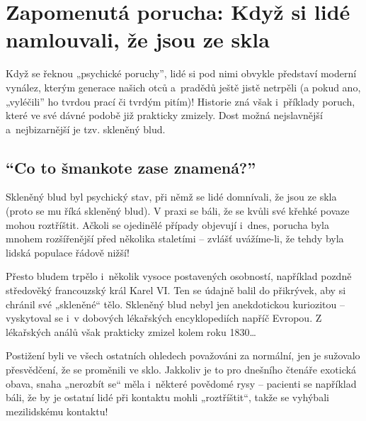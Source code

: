 \documentclass[main.tex]{subfiles}
\begin{document}
\section{Zapomenutá porucha: Když si lidé namlouvali, že jsou ze skla}
Když se řeknou „psychické poruchy”, lidé si pod nimi obvykle představí moderní vynález, kterým generace našich otců a~pradědů ještě jistě netrpěli (a pokud ano, „vyléčili” ho tvrdou prací či tvrdým pitím)! Historie zná však i~příklady poruch, které ve své dávné podobě již prakticky zmizely. Dost možná nejslavnější a~nejbizarnější je tzv. skleněný blud.
\subsection*{\enquote{Co to šmankote zase znamená?}}
Skleněný blud byl psychický stav, při němž se lidé domnívali, že jsou ze skla (proto se mu říká skleněný blud). V praxi se báli, že se kvůli své křehké povaze mohou roztříštit. Ačkoli se ojedinělé případy objevují i~dnes, porucha byla mnohem rozšířenější před několika staletími – zvlášť uvážíme-li, že tehdy byla lidská populace řádově nižší!\par
Přesto bludem trpělo i~několik vysoce postavených osobností, například pozdně středověký francouzský král Karel VI. Ten se údajně balil do přikrývek, aby si chránil své „skleněné“ tělo. Skleněný blud nebyl jen anekdotickou kuriozitou – vyskytoval se i~v dobových lékařských encyklopediích napříč Evropou. Z lékařských análů však prakticky zmizel kolem roku 1830…\par
Postižení byli ve všech ostatních ohledech považováni za normální, jen je sužovalo přesvědčení, že se proměnili ve sklo. Jakkoliv je to pro dnešního čtenáře exotická obava, snaha „nerozbít se“ měla i~některé povědomé rysy – pacienti se například báli, že by je ostatní lidé při kontaktu mohli „roztříštit“, takže se vyhýbali mezilidskému kontaktu!
\end{document}
